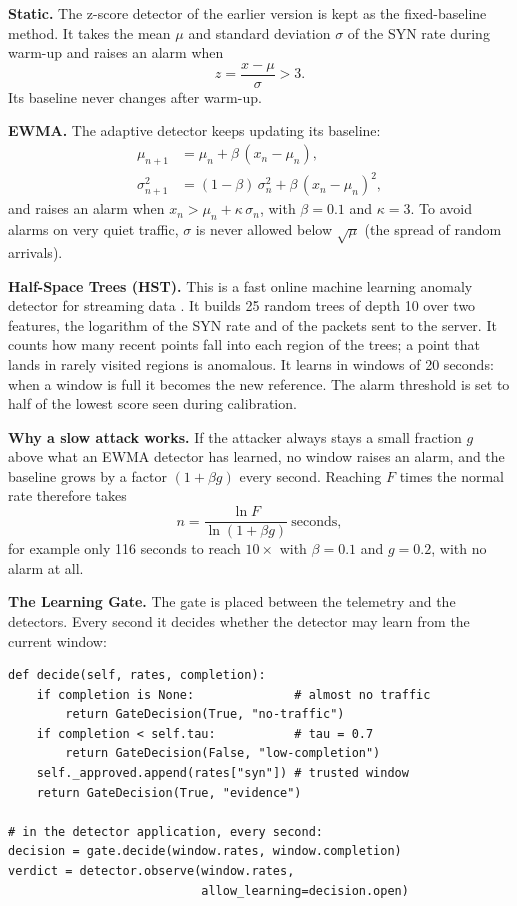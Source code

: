 \documentclass[12pt,a4paper]{article}
\begin{document}
\textbf{Static.} The z-score detector of the earlier version is kept as the
fixed-baseline method. It takes the mean $\mu$ and standard deviation $\sigma$
of the SYN rate during warm-up and raises an alarm when
\begin{equation}
  z = \frac{x - \mu}{\sigma} > 3 .
\end{equation}
Its baseline never changes after warm-up.

\textbf{EWMA.} The adaptive detector keeps updating its baseline:
\begin{align}
  \mu_{n+1} &= \mu_n + \beta\,(x_n - \mu_n), \\
  \sigma^2_{n+1} &= (1-\beta)\,\sigma^2_n + \beta\,(x_n - \mu_n)^2 ,
\end{align}
and raises an alarm when $x_n > \mu_n + \kappa\,\sigma_n$, with $\beta = 0.1$ and
$\kappa = 3$. To avoid alarms on very quiet traffic, $\sigma$ is never allowed
below $\sqrt{\mu}$ (the spread of random arrivals).

\textbf{Half-Space Trees (HST).} This is a fast online machine learning anomaly
detector for streaming data \cite{tan2011}. It builds 25 random trees of depth
10 over two features, the logarithm of the SYN rate and of the packets sent to
the server. It counts how many recent points fall into each region of the
trees; a point that lands in rarely visited regions is anomalous. It learns in
windows of 20 seconds: when a window is full it becomes the new reference.
The alarm threshold is set to half of the lowest score seen during calibration.

\textbf{Why a slow attack works.} If the attacker always stays a small
fraction $g$ above what an EWMA detector has learned, no window raises an alarm,
and the baseline grows by a factor $(1 + \beta g)$ every second. Reaching $F$
times the normal rate therefore takes
\begin{equation}
  n = \frac{\ln F}{\ln(1 + \beta g)} \ \text{seconds},
\end{equation}
for example only 116 seconds to reach $10\times$ with $\beta = 0.1$ and
$g = 0.2$, with no alarm at all.

\textbf{The Learning Gate.} The gate is placed between the telemetry and the
detectors. Every second it decides whether the detector may learn from the
current window:

\begin{lstlisting}[caption={Decision of the Learning Gate (simplified)}]
def decide(self, rates, completion):
    if completion is None:              # almost no traffic
        return GateDecision(True, "no-traffic")
    if completion < self.tau:           # tau = 0.7
        return GateDecision(False, "low-completion")
    self._approved.append(rates["syn"]) # trusted window
    return GateDecision(True, "evidence")

# in the detector application, every second:
decision = gate.decide(window.rates, window.completion)
verdict = detector.observe(window.rates,
                           allow_learning=decision.open)
\end{lstlisting}
\end{document}
